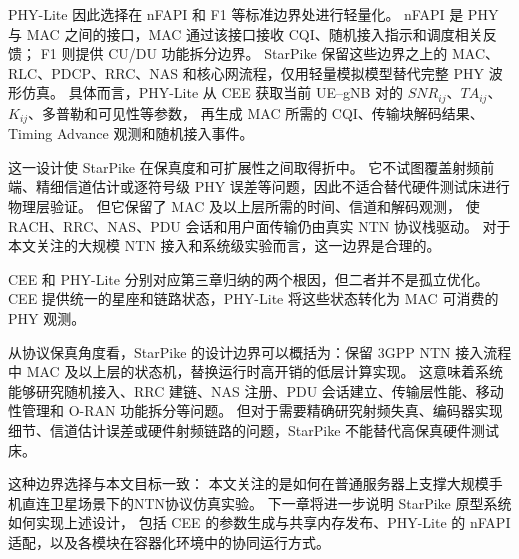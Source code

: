 PHY-Lite 因此选择在 nFAPI 和 F1 等标准边界处进行轻量化。
nFAPI 是 PHY 与 MAC 之间的接口，MAC 通过该接口接收 CQI、随机接入指示和调度相关反馈；
F1 则提供 CU/DU 功能拆分边界。
StarPike 保留这些边界之上的 MAC、RLC、PDCP、RRC、NAS 和核心网流程，仅用轻量模拟模型替代完整 PHY 波形仿真。
具体而言，PHY-Lite 从 CEE 获取当前 UE--gNB 对的 $SNR_{ij}$、$TA_{ij}$、$K_{ij}$、多普勒和可见性等参数，
再生成 MAC 所需的 CQI、传输块解码结果、Timing Advance 观测和随机接入事件。

这一设计使 StarPike 在保真度和可扩展性之间取得折中。
它不试图覆盖射频前端、精细信道估计或逐符号级 PHY 误差等问题，因此不适合替代硬件测试床进行物理层验证。
但它保留了 MAC 及以上层所需的时间、信道和解码观测，
使 RACH、RRC、NAS、PDU 会话和用户面传输仍由真实 NTN 协议栈驱动。
对于本文关注的大规模 NTN 接入和系统级实验而言，这一边界是合理的。


CEE 和 PHY-Lite 分别对应第三章归纳的两个根因，但二者并不是孤立优化。
CEE 提供统一的星座和链路状态，PHY-Lite 将这些状态转化为 MAC 可消费的 PHY 观测。

从协议保真角度看，StarPike 的设计边界可以概括为：保留 3GPP NTN 接入流程中 MAC 及以上层的状态机，替换运行时高开销的低层计算实现。
这意味着系统能够研究随机接入、RRC 建链、NAS 注册、PDU 会话建立、传输层性能、移动性管理和 O-RAN 功能拆分等问题。
但对于需要精确研究射频失真、编码器实现细节、信道估计误差或硬件射频链路的问题，StarPike 不能替代高保真硬件测试床。

这种边界选择与本文目标一致：
本文关注的是如何在普通服务器上支撑大规模手机直连卫星场景下的NTN协议仿真实验。
下一章将进一步说明 StarPike 原型系统如何实现上述设计，
包括 CEE 的参数生成与共享内存发布、PHY-Lite 的 nFAPI 适配，以及各模块在容器化环境中的协同运行方式。
